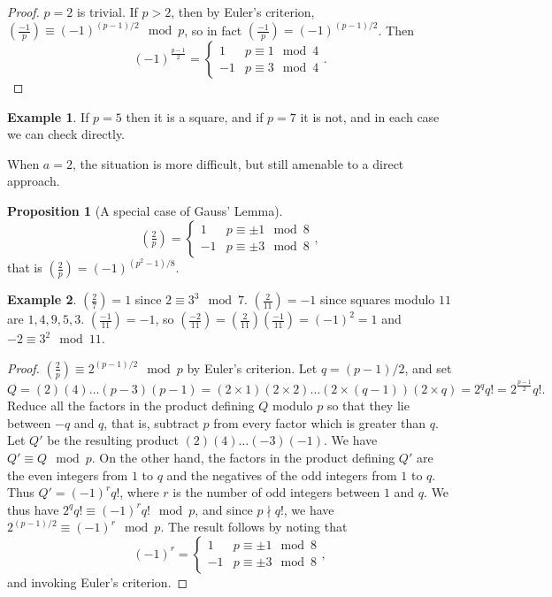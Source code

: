 \documentclass{article}
\newcommand{\rb}[1]{\left( #1 \right)}
\newcommand{\legendre}[2]{\rb{\tfrac{#1}{#2}}}
\theoremstyle{definition}\newtheorem{definition}{Definition}
\theoremstyle{definition}\newtheorem*{remark}{Remark}
\theoremstyle{definition}\newtheorem*{example}{Example}
\theoremstyle{definition}\newtheorem*{note}{Note}
\newtheorem{proposition}[definition]{Proposition}
\begin{document}
\begin{proof}
$ p = 2 $ is trivial. If $ p > 2 $, then by Euler's criterion, $ \legendre{-1}{p} \equiv \rb{-1}^{\rb{p - 1} / 2} \mod p $, so in fact $ \legendre{-1}{p} = \rb{-1}^{\rb{p - 1} / 2} $. Then
$$ \rb{-1}^{\tfrac{p - 1}{2}} = \begin{cases} 1 & p \equiv 1 \mod 4 \\ -1 & p \equiv 3 \mod 4 \end{cases}. $$
\end{proof}

\begin{example}
If $ p = 5 $ then it is a square, and if $ p = 7 $ it is not, and in each case we can check directly.
\end{example}

When $ a = 2 $, the situation is more difficult, but still amenable to a direct approach.

\begin{proposition}[A special case of Gauss' Lemma]
$$ \legendre{2}{p} = \begin{cases} 1 & p \equiv \pm 1 \mod 8 \\ -1 & p \equiv \pm 3 \mod 8 \end{cases}, $$
that is $ \legendre{2}{p} = \rb{-1}^{\rb{p^2 - 1} / 8} $.
\end{proposition}

\begin{example}
$ \legendre{2}{7} = 1 $ since $ 2 \equiv 3^3 \mod 7 $. $ \legendre{2}{11} = -1 $ since squares modulo $ 11 $ are $ 1, 4, 9, 5, 3 $. $ \legendre{-1}{11} = -1 $, so $ \legendre{-2}{11} = \legendre{2}{11}\legendre{-1}{11} = \rb{-1}^2 = 1 $ and $ -2 \equiv 3^2 \mod 11 $.
\end{example}

\begin{proof}
$ \legendre{2}{p} \equiv 2^{\rb{p - 1} / 2} \mod p $ by Euler's criterion. Let $ q = \rb{p - 1} / 2 $, and set
$$ Q = \rb{2}\rb{4} \dots \rb{p - 3}\rb{p - 1} = \rb{2 \times 1}\rb{2 \times 2} \dots \rb{2 \times \rb{q - 1}}\rb{2 \times q} = 2^qq! = 2^{\tfrac{p - 1}{2}}q!. $$
Reduce all the factors in the product defining $ Q $ modulo $ p $ so that they lie between $ -q $ and $ q $, that is, subtract $ p $ from every factor which is greater than $ q $. Let $ Q' $ be the resulting product $ \rb{2}\rb{4} \dots \rb{-3}\rb{-1} $. We have $ Q' \equiv Q \mod p $. On the other hand, the factors in the product defining $ Q' $ are the even integers from $ 1 $ to $ q $ and the negatives of the odd integers from $ 1 $ to $ q $. Thus $ Q' = \rb{-1}^rq! $, where $ r $ is the number of odd integers between $ 1 $ and $ q $. We thus have $ 2^qq! \equiv \rb{-1}^rq! \mod p $, and since $ p \nmid q! $, we have $ 2^{\rb{p - 1} / 2} \equiv \rb{-1}^r \mod p $. The result follows by noting that
$$ \rb{-1}^r = \begin{cases} 1 & p \equiv \pm 1 \mod 8 \\ -1 & p \equiv \pm 3 \mod 8 \end{cases}, $$
and invoking Euler's criterion.
\end{proof}
\end{document}
